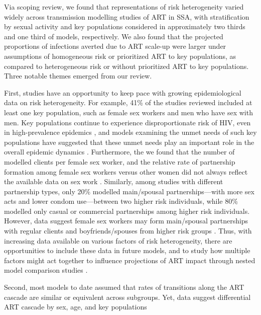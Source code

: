Via scoping review, we found that representations of risk heterogeneity varied widely across
transmission modelling studies of ART in SSA, with
stratification by sexual activity and key populations considered in approximately
two thirds and one third of models, respectively.
We also found that the projected proportions of infections averted due to ART scale-up were
larger under assumptions of homogeneous risk or prioritized ART to key populations,
as compared to heterogeneous risk or without prioritized ART to key populations.  %
Three notable themes emerged from our review.
\par %
First, studies have an opportunity to keep pace with growing epidemiological data on risk heterogeneity.
For example, 41\% of the studies reviewed included at least one key population,
such as female sex workers and men who have sex with men.
Key populations continue to experience disproportionate risk of HIV, even in high-prevalence epidemics \cite{TODO},
and models examining the unmet needs of such key populations have suggested that
these unmet needs play an important role in the overall epidemic dynamics \cite{Stone2021,Bekker2015}.
Furthermore, the we found that the number of modelled clients per female sex worker, and
the relative rate of partnership formation among female sex workers versus other women
did not always reflect the available data on sex work \cite{Watts2010,Scorgie2012}.
Similarly, among studies with different partnership types, only 20\% modelled
main/spousal partnerships---with more sex acts and lower condom use---between two higher risk individuals,
while 80\% modelled only casual or commercial partnerships among higher risk individuals.
However, data suggest female sex workers may form main/spousal partnerships
with regular clients and boyfriends/spouses from higher risk groups \cite{Scorgie2012}.
Thus, with increasing data available on various factors of risk heterogeneity,
there are opportunities to include these data in future models,
and to study how multiple factors might act together to influence projections of ART impact
through nested model comparison studies \cite{Dodd2010,Hontelez2013}.
\par
Second, most models to date assumed that rates of transitions along the ART cascade are
similar or equivalent across subgroups. Yet, data suggest differential ART cascade by sex, age, and key populations
